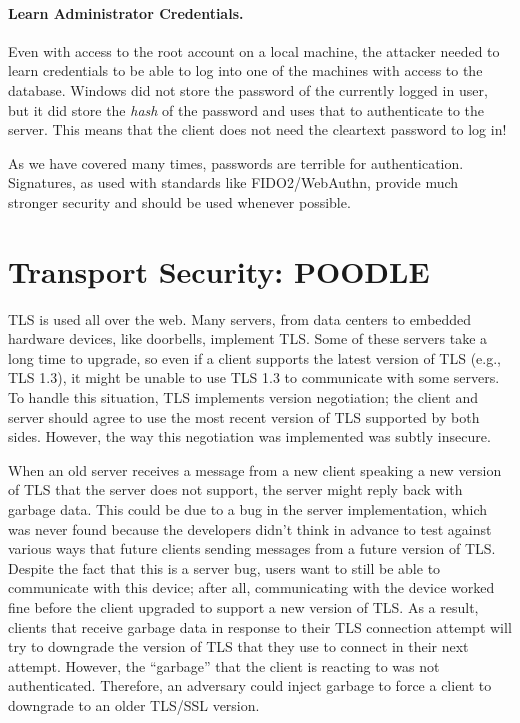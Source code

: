\paragraph{Learn Administrator Credentials.} Even with access to the root account on a local machine, the attacker needed to learn credentials to be able to log into one of the machines with access to the database. Windows did not store the password of the currently logged in user, but it did store the \emph{hash} of the password and uses that to authenticate to the server. This means that the client does not need the cleartext password to log in!

As we have covered many times, passwords are terrible for authentication. Signatures, as used with standards like FIDO2/WebAuthn, provide much stronger security and should be used whenever possible.

\section{Transport Security: POODLE}

TLS is used all over the web.  Many servers, from data centers to embedded
hardware devices, like doorbells, implement TLS.  Some of these servers
take a long time to upgrade, so even if a client supports the latest
version of TLS (e.g., TLS 1.3), it might be unable to use TLS 1.3 to
communicate with some servers.  To handle this situation, TLS implements
version negotiation; the client and server should agree to use the most
recent version of TLS supported by both sides.  However, the way this
negotiation was implemented was subtly insecure.

When an old server receives a message from a new client speaking a
new version of TLS that the server does not support, the server might
reply back with garbage data.  This could be due to a bug in the server
implementation, which was never found because the developers didn't
think in advance to test against various ways that future clients sending
messages from a future version of TLS.  Despite the fact that this is a
server bug, users want to still be able to communicate with this device;
after all, communicating with the device worked fine before the client
upgraded to support a new version of TLS.  As a result, clients that
receive garbage data in response to their TLS connection attempt will
try to downgrade the version of TLS that they use to connect in their
next attempt.  However, the ``garbage'' that the client is reacting to
was not authenticated.  Therefore, an adversary could inject garbage to
force a client to downgrade to an older TLS/SSL version.

